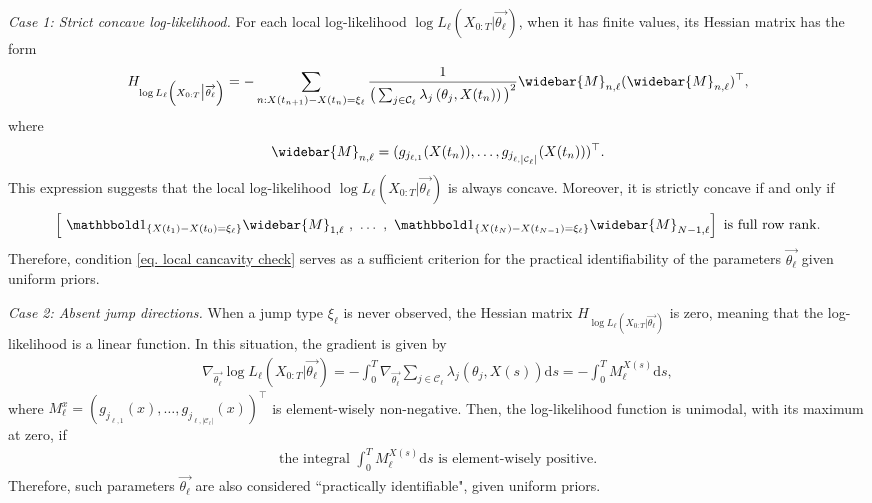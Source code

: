 \documentclass[pdflatex,sn-mathphys-num]{sn-jnl}%
\def\dd{\text{d}}
\theoremstyle{thmstyleone}%
\theoremstyle{thmstyletwo}%
\theoremstyle{thmstylethree}%
\begin{document}
\textit{Case 1: Strict concave log-likelihood. } 
For each local log-likelihood $\log L_\ell\left(X_{0:T}\big|\overrightarrow{\theta_\ell}\right)$, when it has finite values, its Hessian matrix has the form
\begin{align*}
H_{\log L_\ell\left(X_{0:T}\big|\overrightarrow{\theta_\ell}\right)}
= - \sum_{n: X(t_{n+1})-X(t_n) = \xi_\ell} \frac{1}{ \big( \sum_{j \in \mathcal C_\ell} \lambda_j \left(\theta_j, X(t_n)\right) \big)^2 } \widebar{M}_{n, \ell} (\widebar{M}_{n,\ell})^{\top} ,
\end{align*}
where
\[
\widebar{M}_{n, \ell} = (g_{j_{\ell, 1}}(X(t_n)), \dots, g_{j_{\ell, \left|\mathcal C_\ell\right|}}(X(t_n)))^{\top}.
\]
This expression suggests that the local log-likelihood $\log L_\ell\left(X_{0:T}\big|\overrightarrow{\theta_\ell}\right)$ is always concave.
Moreover, it is strictly concave if and only if 
\begin{align}\label{eq. local cancavity check}
    \left[~
    \mathbbold 1_{\{X(t_1)- X(t_0)=\xi_\ell\}} \widebar{M}_{1,\ell} ~, ~\dots~,~ 
    \mathbbold 1_{\{X(t_{N})- X(t_{N -1})=\xi_\ell\}} \widebar{M}_{N-1, \ell}
    \right]
    \text{ is full row rank}.
\end{align}
Therefore, condition \eqref{eq. local cancavity check} serves as a sufficient criterion for the practical identifiability of the parameters $\overrightarrow{\theta_\ell}$ given uniform priors.

\medskip

\textit{Case 2: Absent jump directions. } 
When a jump type $\xi_\ell$ is never observed, the Hessian matrix $H_{\log L_\ell\left(X_{0:T}\big|\overrightarrow{\theta_\ell}\right)}$ is zero, meaning that the log-likelihood is a linear function.
In this situation, the gradient is given by
\begin{align*}
    \nabla_{\overrightarrow{\theta_\ell}}\log L_\ell\left(X_{0:T}\big|\overrightarrow{\theta_\ell}\right) 
     = -\int_0^T \nabla_{\overrightarrow{\theta_\ell}}\sum_{j\in\mathcal C_\ell } \lambda_j(\theta_j, X(s)) \dd s
     = - \int_0^{T} M_{\ell}^{X(s)} \dd s,
\end{align*}
where $M_{\ell}^{x} = \left(g_{j_{\ell, 1}}(x), \dots, g_{j_{\ell, \left|\mathcal C_\ell\right|}}(x)\right)^{\top}$ is element-wisely non-negative. 
Then, the log-likelihood function is unimodal, with its maximum at zero, if 
\begin{align}
\text{the integral $\int_0^{T} M_{\ell}^{X(s)} \dd s$ is element-wisely positive.}
\end{align}
Therefore, such parameters $\overrightarrow{\theta_\ell}$ are also considered ``practically identifiable", given uniform priors.
\end{document}
